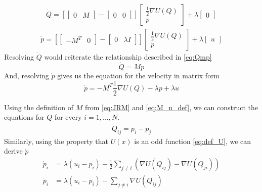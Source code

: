 \begin{gather*}
    \dot Q = 
    \left[
    \begin{bmatrix}
        0 & M
    \end{bmatrix}
    - \begin{bmatrix}
        0 & 0
    \end{bmatrix}
    \right]
    \begin{bmatrix}
        \frac{1}{2}\nabla U(Q) \\
        p
    \end{bmatrix}
    +\lambda\begin{bmatrix}
        0
    \end{bmatrix}
\end{gather*}
\begin{gather*}
    \dot p= 
    \left[
    \begin{bmatrix}
        -M^T & 0
    \end{bmatrix}
    - \begin{bmatrix}
        0 & \lambda I
    \end{bmatrix}
    \right]
    \begin{bmatrix}
        \frac{1}{2}\nabla U(Q) \\
        p
    \end{bmatrix}
    +\lambda\begin{bmatrix}
        u
    \end{bmatrix}
\end{gather*}
Resolving $\dot Q$ would reiterate the relationship described in \autoref{eq:Qmp}
\begin{equation*}
    \dot Q = Mp
\end{equation*}
And, resolving $\dot p$ gives us the equation for the velocity in matrix form
\begin{equation*}
    \dot p = -M^T\frac{1}{2}\nabla U(Q) - \lambda p + \lambda u
\end{equation*}

Using the definition of $M$ from \autoref{eq:JRM} and \autoref{eq:M_n_def}, we can construct the equations for $Q$ for every $i = 1,\dots,N$.
\begin{align*}
    \dot Q_{ij} = p_i - p_j
\end{align*}
Similarly, using the property that $U(x)$ is an odd function \autoref{eq:def_U}, we can derive $\dot p$
\begin{align*}
    \dot p_i &= \lambda(u_i - p_i) - \frac{1}{2}\sum_{j \neq i}(\nabla U(Q_{ij}) - \nabla U(Q_{ji})) \\ 
    \dot p_i &= \lambda(u_i - p_i) - \sum_{j \neq i}\nabla U(Q_{ij}) 
\end{align*}

